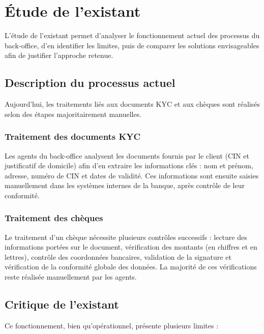 \section{Étude de l'existant}

L'étude de l'existant permet d'analyser le fonctionnement actuel des
processus du back-office, d'en identifier les limites, puis de comparer les
solutions envisageables afin de justifier l'approche retenue.

\subsection*{Description du processus actuel}

Aujourd'hui, les traitements liés aux documents KYC et aux chèques sont
réalisés selon des étapes majoritairement manuelles.

\subsubsection{Traitement des documents KYC}

Les agents du back-office analysent les documents fournis par le client
(CIN et justificatif de domicile) afin d'en extraire les informations
clés : nom et prénom, adresse, numéro de CIN et dates de validité. Ces
informations sont ensuite saisies manuellement dans les systèmes internes
de la banque, après contrôle de leur conformité.

\subsubsection{Traitement des chèques}

Le traitement d'un chèque nécessite plusieurs contrôles successifs : lecture
des informations portées sur le document, vérification des montants (en
chiffres et en lettres), contrôle des coordonnées bancaires, validation de
la signature et vérification de la conformité globale des données. La
majorité de ces vérifications reste réalisée manuellement par les agents.

\subsection*{Critique de l'existant}

Ce fonctionnement, bien qu'opérationnel, présente plusieurs limites :

